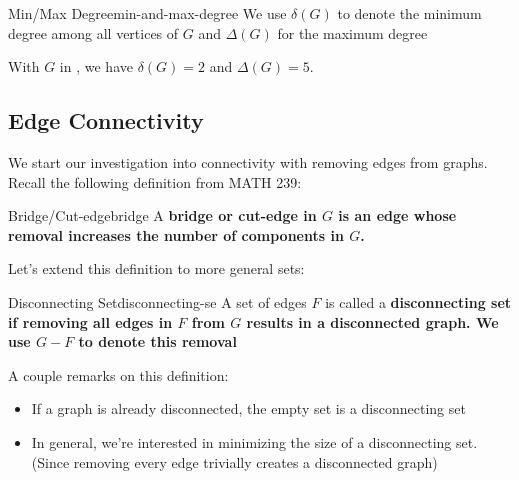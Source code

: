 \begin{figure}[htbp]
\begin{subfigure}{.24\textwidth}
  \end{subfigure}

  \caption{}
  \label{fig:connectivity-introduction-subgraph-examples}
\end{figure}

\begin{definition}{Min/Max Degree}{min-and-max-degree}
    We use $\delta(G)$ to denote the minimum degree among all vertices of $G$ and $\Delta(G)$ for the maximum degree
\end{definition}

\begin{example}
    With $G$ in , we have $\delta(G) = 2$ and $\Delta(G) = 5$.
\end{example}

\subsection{Edge Connectivity}
We start our investigation into connectivity with removing edges from graphs.
Recall the following definition from MATH 239:
\begin{definition}{Bridge/Cut-edge}{bridge}
    A \bf{bridge} or \bf{cut-edge} in $G$ is an edge whose removal increases the number of components in $G$.
\end{definition}

Let's extend this definition to more general sets:
\begin{definition}{Disconnecting Set}{disconnecting-se }
    A set of edges $F$ is called a \bf{disconnecting set} if removing all edges in $F$ from $G$ results in a disconnected graph. We use $G - F$ to denote this removal
\end{definition}

A couple remarks on this definition:
\begin{itemize}
    \item If a graph is already disconnected, the empty set is a disconnecting set
    \item In general, we're interested in minimizing the size of a disconnecting set. (Since removing every edge trivially creates a disconnected graph)
\end{itemize}

